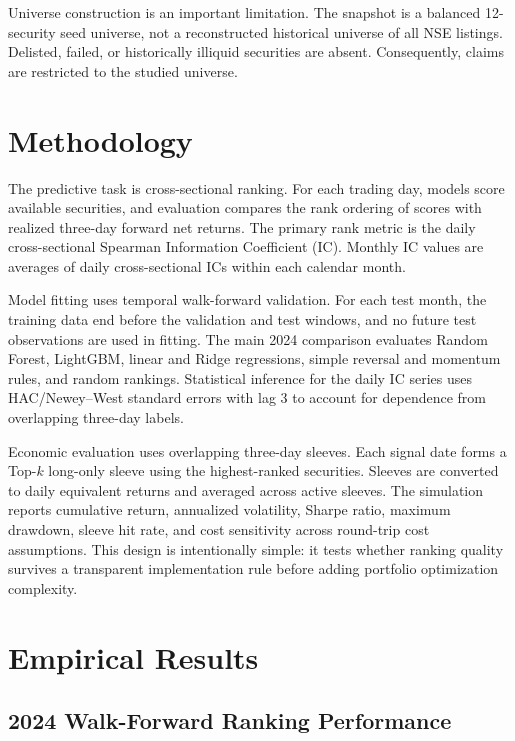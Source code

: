 \documentclass[11pt,a4paper]{article}
\begin{document}
Universe construction is an important limitation.  The snapshot is a balanced
12-security seed universe, not a reconstructed historical universe of all NSE
listings.  Delisted, failed, or historically illiquid securities are absent.
Consequently, claims are restricted to the studied universe.

\section{Methodology}
\label{sec:method}

The predictive task is cross-sectional ranking.  For each trading day, models
score available securities, and evaluation compares the rank ordering of
scores with realized three-day forward net returns.  The primary rank metric
is the daily cross-sectional Spearman Information Coefficient (IC).  Monthly
IC values are averages of daily cross-sectional ICs within each calendar
month.

Model fitting uses temporal walk-forward validation.  For each test month, the
training data end before the validation and test windows, and no future test
observations are used in fitting.  The main 2024 comparison evaluates Random
Forest, LightGBM, linear and Ridge regressions, simple reversal and momentum
rules, and random rankings.  Statistical inference for the daily IC series
uses HAC/Newey--West standard errors with lag 3 to account for dependence from
overlapping three-day labels.

Economic evaluation uses overlapping three-day sleeves.  Each signal date
forms a Top-\(k\) long-only sleeve using the highest-ranked securities.
Sleeves are converted to daily equivalent returns and averaged across active
sleeves.  The simulation reports cumulative return, annualized volatility,
Sharpe ratio, maximum drawdown, sleeve hit rate, and cost sensitivity across
round-trip cost assumptions.  This design is intentionally simple: it tests
whether ranking quality survives a transparent implementation rule before
adding portfolio optimization complexity.

\section{Empirical Results}
\label{sec:results}

\subsection{2024 Walk-Forward Ranking Performance}
\end{document}
